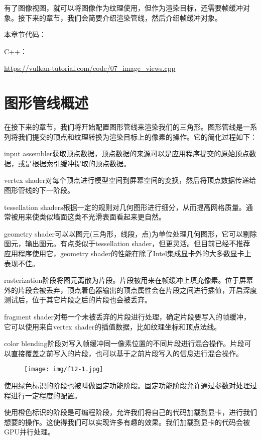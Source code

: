 \documentclass{ctexart}
\begin{document}
有了图像视图，就可以将图像作为纹理使用，但作为渲染目标，还需要帧缓冲对象。接下来的章节，我们会简要介绍渲染管线，然后介绍帧缓冲对象。

本章节代码：

C++：

\url{https://vulkan-tutorial.com/code/07_image_views.cpp}

\newpage
\section{图形管线概述}


在接下来的章节，我们将开始配置图形管线来渲染我们的三角形。图形管线是一系列将我们提交的顶点和纹理转换为渲染目标上的像素的操作。它的简化过程如下：

input assembler获取顶点数据，顶点数据的来源可以是应用程序提交的原始顶点数据，或是根据索引缓冲提取的顶点数据。

vertex shader对每个顶点进行模型空间到屏幕空间的变换，然后将顶点数据传递给图形管线的下一阶段。

tessellation shaders根据一定的规则对几何图形进行细分，从而提高网格质量。通常被用来使类似墙面这类不光滑表面看起来更自然。

geometry shader可以以图元(三角形，线段，点)为单位处理几何图形，它可以剔除图元，输出图元。有点类似于tessellation shader，但更灵活。但目前已经不推荐应用程序使用它，geometry shader的性能在除了Intel集成显卡外的大多数显卡上表现不佳。

rasterization阶段将图元离散为片段。片段被用来在帧缓冲上填充像素。位于屏幕外的片段会被丢弃，顶点着色器输出的顶点属性会在片段之间进行插值，开启深度测试后，位于其它片段之后的片段也会被丢弃。

fragment shader对每一个未被丢弃的片段进行处理，确定片段要写入的帧缓冲，它可以使用来自vertex shader的插值数据，比如纹理坐标和顶点法线。

color blending阶段对写入帧缓冲同一像素位置的不同片段进行混合操作。片段可以直接覆盖之前写入的片段，也可以基于之前片段写入的信息进行混合操作。

\begin{figure}[H]
	\centering
	\texttt{[image: img/f12-1.jpg]}
\end{figure}

使用绿色标识的阶段也被叫做固定功能阶段。固定功能阶段允许通过参数对处理过程进行一定程度的配置。

使用橙色标识的阶段是可编程阶段，允许我们将自己的代码加载到显卡，进行我们想要的操作。这使得我们可以实现许多有趣的效果。我们加载到显卡的代码会被GPU并行处理。
\end{document}
